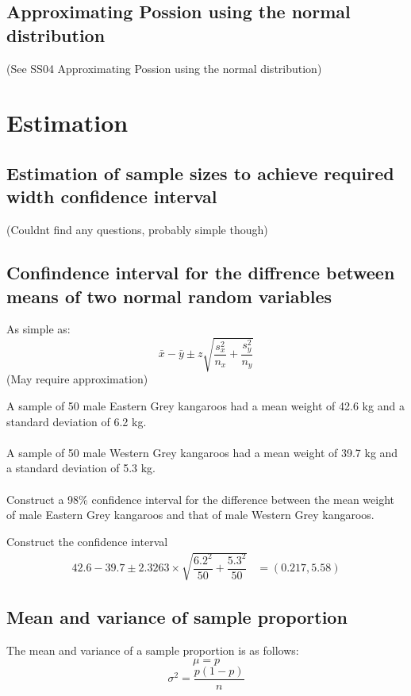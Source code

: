         \subsection{Approximating Possion using the normal distribution}
            (See SS04 Approximating Possion using the normal distribution)


    \section{Estimation}
        \subsection{Estimation of sample sizes to achieve required width confidence interval}
            (Couldnt find any questions, probably simple though)
        \subsection{Confindence interval for the diffrence between means of two normal random variables}
            As simple as:
            $$
            \bar{x} - \bar{y} \pm z \sqrt{\dfrac{s^2_x}{n_x} + \dfrac{s^2_y}{n_y}}
            $$
            (May require approximation)

            \begin{example}
            {
                A sample of 50 male Eastern Grey kangaroos had a mean weight of 42.6 kg and a standard deviation of 6.2 kg.
                \\\\
                A sample of 50 male Western Grey kangaroos had a mean weight of 39.7 kg and a standard deviation of 5.3 kg.
                \\\\
                Construct a 98\% confidence interval for the difference between the mean weight of male Eastern Grey kangaroos and that of male Western Grey kangaroos.
            }
                \begin{step}{Construct the confidence interval}
                    \begin{align*}
                        42.6 - 39.7 \pm 2.3263 \times \sqrt{\dfrac{6.2^2}{50} + \dfrac{5.3^2}{50}} &= (0.217, 5.58)
                    \end{align*}
                \end{step}
            \end{example}

        \subsection{Mean and variance of sample proportion}
            The mean and variance of a sample proportion is as follows:
            $$\mu = p$$
            $$\sigma^2 = \dfrac{p(1-p)}{n}$$

